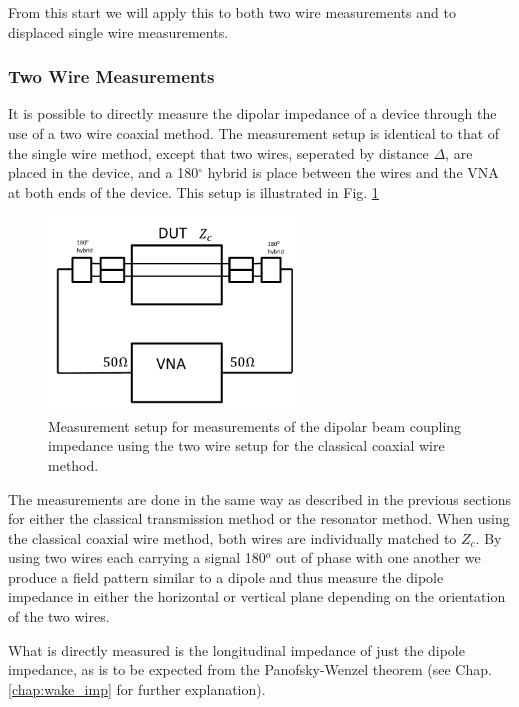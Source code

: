 From this start we will apply this to both two wire measurements and to displaced single wire measurements.

\subsubsection{Two Wire Measurements}

It is possible to directly measure the dipolar impedance of a device through the use of a two wire coaxial method. The measurement setup is identical to that of the single wire method, except that two wires, seperated by distance $\Delta$, are placed in the device, and a 180$^{\circ}$ hybrid is place between the wires and the VNA at both ends of the device. This setup is illustrated in Fig. \ref{fig:two_wire_measure}

\begin{figure}
\begin{center}
\includegraphics[width=0.6\textwidth]{Bench_Top_Measurements/figures/wire_meas_two_wire.pdf}
\end{center}
\label{fig:two_wire_measure}
\caption{Measurement setup for measurements of the dipolar beam coupling impedance using the two wire setup for the classical coaxial wire method.}
\end{figure}

The measurements are done in the same way as described in the previous sections for either the classical transmission method or the resonator method. When using the classical coaxial wire method, both wires are individually matched to $Z_{c}$. By using two wires each carrying a signal 180$^{o}$ out of phase with one another we produce a field pattern similar to a dipole and thus measure the dipole impedance in either the horizontal or vertical plane depending on the orientation of the two wires. 

What is directly measured is the longitudinal impedance of just the dipole impedance, as is to be expected from the Panofsky-Wenzel theorem (see Chap. \ref{chap:wake_imp} for further explanation). 

